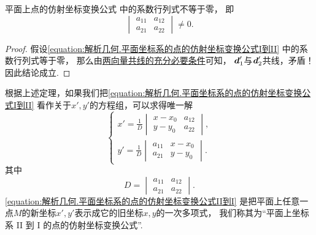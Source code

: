 \begin{theorem}
平面上点的仿射坐标变换公式 
中的系数行列式不等于零，
即\begin{equation*}
	\begin{vmatrix}
		a_{11} & a_{12} \\
		a_{21} & a_{22}
	\end{vmatrix} \neq 0.
\end{equation*}
\begin{proof}
假设\cref{equation:解析几何.平面坐标系的点的仿射坐标变换公式I到II} 中的系数行列式等于零，
那么由\hyperref[theorem:解析几何.两向量共线的充分必要条件2]{两向量共线的充分必要条件}可知，
\(\boldsymbol{d}_1'\)与\(\boldsymbol{d}_2'\)共线，矛盾！
因此结论成立.
\end{proof}
\end{theorem}

根据上述定理，如果我们把\cref{equation:解析几何.平面坐标系的点的仿射坐标变换公式I到II}
看作关于\(x',y'\)的方程组，可以求得唯一解
\begin{equation}\label{equation:解析几何.平面坐标系的点的仿射坐标变换公式II到I}
	\left\{ \begin{array}{l}
		x' = \frac{1}{D} \begin{vmatrix}
			x - x_0 & a_{12} \\
			y - y_0 & a_{22}
		\end{vmatrix}, \\
		y' = \frac{1}{D} \begin{vmatrix}
			a_{11} & x - x_0 \\
			a_{21} & y - y_0
		\end{vmatrix}.
	\end{array} \right.
\end{equation}
其中\begin{equation*}
	D = \begin{vmatrix}
		a_{11} & a_{12} \\
		a_{21} & a_{22}
	\end{vmatrix}.
\end{equation*}
\cref{equation:解析几何.平面坐标系的点的仿射坐标变换公式II到I}
是把平面上任意一点\(M\)的新坐标\(x',y'\)表示成它的旧坐标\(x,y\)的一次多项式，
我们称其为“平面上坐标系 II 到 I 的点的仿射坐标变换公式”.

